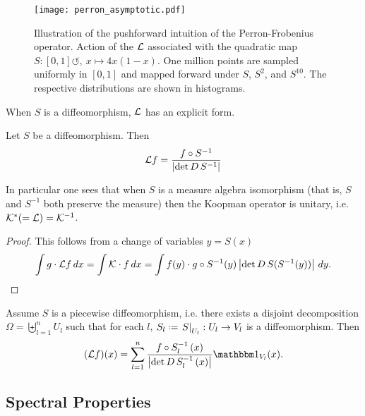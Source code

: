 \begin{figure}
    \centering
    \texttt{[image: perron\_asymptotic.pdf]}
    \caption{
        Illustration of the pushforward intuition of the Perron-Frobenius operator. 
        Action of the $\mathcal{L}$ associated with the quadratic map 
        $S : [0, 1] \circlearrowleft,\ x \mapsto 4 x (1 - x)$. One million points are 
        sampled uniformly in $[0, 1]$ and mapped forward under $S$, $S^2$, and $S^{10}$. 
        The respective distributions are shown in histograms. 
    }\label{fig:perron_asymptotic}
\end{figure}

When $S$ is a diffeomorphism, $\mathcal{L}$ has an explicit form. 

\begin{theorem}
    Let $S$ be a diffeomorphism. Then 
    \begin{equation}
        \mathcal{L} f = \frac{f \circ S^{-1}}{\left| \det D\,S^{-1} \right|}
    \end{equation}
\end{theorem}

In particular one sees that when $S$ is a measure algebra isomorphism (that is, $S$ and 
$S^{-1}$ both preserve the measure) then the Koopman operator is unitary, i.e. 
$\mathcal{K}^* (= \mathcal{L}) = \mathcal{K}^{-1}$. 

\begin{proof}
    This follows from a change of variables $y = S(x)$
    \begin{equation}
        \int g \cdot \mathcal{L} f \,dx = \int \mathcal{K} \cdot f \,dx 
        = \int f(y) \cdot g \circ S^{-1} (y) \left| \det D\,S (S^{-1} (y)) \right| \,dy . 
    \end{equation}
\end{proof}

\begin{corollary}
    Assume $S$ is a piecewise diffeomorphism, i.e. there exists a disjoint decomposition 
    $\Omega = \biguplus_{l=1}^n U_l$ such that for each $l$, 
    $S_l \defeq \left. S \right|_{U_l} : U_l \to V_l$ is a diffeomorphism. Then 
    \begin{equation}
        (\scrL f) (x) = \sum_{l=1}^{n} 
        \frac{f \circ S_l^{-1} \,(x)}{\left| \det D\,S_l^{-1}\,(x) \right|} \bbone_{V_l} (x) . 
    \end{equation}
\end{corollary}


\subsection{Spectral Properties}

